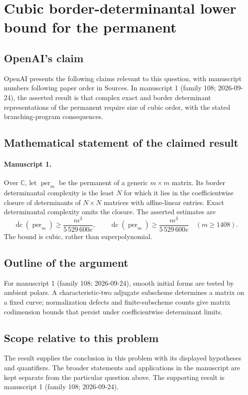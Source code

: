 \documentclass[11pt]{article}
\begin{document}
\section*{Cubic border-determinantal lower bound for the permanent}

\subsection{OpenAI's claim}
OpenAI presents the following claims relevant to this question, with manuscript numbers following paper order in Sources. In manuscript 1 (family 108; 2026-09-24), the asserted result is that complex exact and border determinant representations of the permanent require size of cubic order, with the stated branching-program consequences.

\subsection{Mathematical statement of the claimed result}
\paragraph{Manuscript 1.}
Over $\mathbb C$, let $\operatorname{per}_m$ be the permanent of a generic $m\times m$ matrix. Its border determinantal complexity is the least $N$ for which it lies in the coefficientwise closure of determinants of $N\times N$ matrices with affine-linear entries. Exact determinantal complexity omits the closure. The asserted estimates are
\[
 \overline{\operatorname{dc}}(\operatorname{per}_m)\ge\frac{m^3}{5\,529\,600e},\qquad
 \operatorname{dc}(\operatorname{per}_m)\ge\frac{m^3}{5\,529\,600e}\quad(m\ge1408).
\]
The bound is cubic, rather than superpolynomial.

\subsection{Outline of the argument}
For manuscript 1 (family 108; 2026-09-24), smooth initial forms are tested by ambient polars. A characteristic-two adjugate subscheme determines a matrix on a fixed curve; normalization defects and finite-subscheme counts give matrix codimension bounds that persist under coefficientwise determinant limits.

\subsection{Scope relative to this problem}
The result supplies the conclusion in this problem with its displayed hypotheses and quantifiers. The broader statements and applications in the manuscript are kept separate from the particular question above. The supporting result is manuscript 1 (family 108; 2026-09-24).
\end{document}
